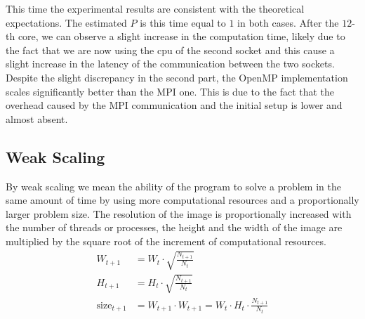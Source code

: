 \begin{figure}[H]
{
        }
    \end{figure}
    This time the experimental results are consistent with the theoretical
    expectations. The estimated $P$ is this time equal to $1$ in both cases.
    After the $12$-th core, we can observe a slight increase in the
    computation time, likely due to the fact that we are now using the cpu
    of the second socket and this cause a slight increase in the latency of
    the communication between the two sockets.
    Despite the slight discrepancy in the second part, the OpenMP implementation
    scales significantly better than the MPI one. This is due to the fact that
    the overhead caused by the MPI communication and the initial setup is
    lower and almost absent.

\subsection{Weak Scaling}
    By weak scaling we mean the ability of the program to solve a problem
    in the same amount of time by using more computational resources and
    a proportionally larger problem size. The resolution of the image is
    proportionally increased with the number of threads or processes, the
    height and the width of the image are multiplied by the square root
    of the increment of computational resources.
    \begin{align*}
        W_{t+1} &= W_t \cdot \sqrt{\frac{N_{t+1}}{N_{t}}} \\
        H_{t+1} &= H_t \cdot \sqrt{\frac{N_{t+1}}{N_{t}}} \\
        \text{size}_{t+1} &= W_{t+1} \cdot W_{t+1} = W_{t} \cdot H_{t} \cdot \frac{N_{t+1}}{N_{t}}
    \end{align*}

